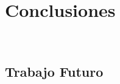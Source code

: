 \chapter{Conclusiones}
~\label{cap:conclusions}

\section{Trabajo Futuro}
~\label{cap:conclusions:sec:future}